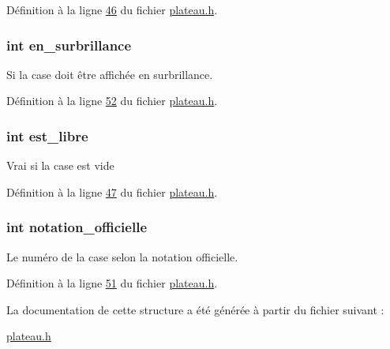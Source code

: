 Définition à la ligne \hyperlink{plateau_8h_source_l00046}{46} du fichier \hyperlink{plateau_8h_source}{plateau.h}.

\hypertarget{structcase__plateau_ae49bb71ca6836b02fd9efa3c1fa64405}{
\subsubsection[{en\_\-surbrillance}]{\setlength{\rightskip}{0pt plus 5cm}int {\bf en\_\-surbrillance}}}
\label{structcase__plateau_ae49bb71ca6836b02fd9efa3c1fa64405}
Si la case doit être affichée en surbrillance. 

Définition à la ligne \hyperlink{plateau_8h_source_l00052}{52} du fichier \hyperlink{plateau_8h_source}{plateau.h}.

\hypertarget{structcase__plateau_a173f25d2fd7c653d77ca8174ba4f636d}{
\subsubsection[{est\_\-libre}]{\setlength{\rightskip}{0pt plus 5cm}int {\bf est\_\-libre}}}
\label{structcase__plateau_a173f25d2fd7c653d77ca8174ba4f636d}
Vrai si la case est vide 

Définition à la ligne \hyperlink{plateau_8h_source_l00047}{47} du fichier \hyperlink{plateau_8h_source}{plateau.h}.

\hypertarget{structcase__plateau_ad510581b324604a9cf685cbb769a421a}{
\subsubsection[{notation\_\-officielle}]{\setlength{\rightskip}{0pt plus 5cm}int {\bf notation\_\-officielle}}}
\label{structcase__plateau_ad510581b324604a9cf685cbb769a421a}
Le numéro de la case selon la notation officielle. 

Définition à la ligne \hyperlink{plateau_8h_source_l00051}{51} du fichier \hyperlink{plateau_8h_source}{plateau.h}.



La documentation de cette structure a été générée à partir du fichier suivant :\begin{DoxyCompactItemize}
\item 
\hyperlink{plateau_8h}{plateau.h}\end{DoxyCompactItemize}
